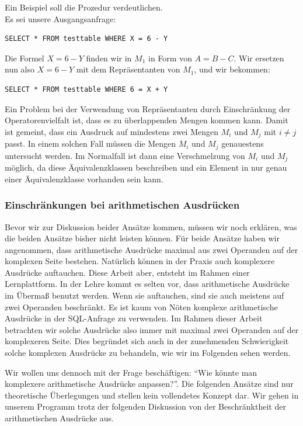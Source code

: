 Ein Beispiel soll die Prozedur verdeutlichen.\\

Es sei unsere Ausgangsanfrage: \begin{verbatim}SELECT * FROM testtable WHERE X = 6 - Y\end{verbatim}

Die Formel $X=6-Y$ finden wir in $M_1$ in Form von $A=B-C$. Wir ersetzen nun also $X=6-Y$ mit dem Repräsentanten von $M_1$, und wir bekommen: \begin{verbatim}SELECT * FROM testtable WHERE 6 = X + Y\end{verbatim}

Ein Problem bei der Verwendung von Repräsentanten durch Einschränkung der Operatorenvielfalt ist, dass es zu überlappenden Mengen kommen kann. Damit ist gemeint, dass ein Ausdruck auf mindestens zwei Mengen $M_i$ und $M_j$ mit $i\neq j$ passt. In einem solchen Fall müssen die Mengen $M_i$ und $M_j$ genauestens untersucht werden. Im Normalfall ist dann eine Verschmelzung von $M_i$ und $M_j$ möglich, da diese Äquivalenzklassen beschreiben und ein Element in nur genau einer Äquivalenzklasse vorhanden sein kann.

\subsubsection{Einschränkungen bei arithmetischen Ausdrücken}
\label{subsubsec:arithmetic}

Bevor wir zur Diskussion beider Ansätze kommen, müssen wir noch erklären, was die beiden Ansätze bisher nicht leisten können. Für beide Ansätze haben wir angenommen, dass arithmetische Ausdrücke maximal aus zwei Operanden auf der komplexen Seite bestehen. Natürlich können in der Praxis auch komplexere Ausdrücke auftauchen. Diese Arbeit aber, entsteht im Rahmen einer Lernplattform. In der Lehre kommt es selten vor, dass arithmetische Ausdrücke im Übermaß benutzt werden. Wenn sie auftauchen, sind sie auch meistens auf zwei Operanden beschränkt. Es ist kaum von Nöten komplexe arithmetische Ausdrücke in der SQL-Anfrage zu verwenden. Im Rahmen dieser Arbeit betrachten wir solche Ausdrücke also immer mit maximal zwei Operanden auf der komplexeren Seite. Dies begründet sich auch in der zunehmenden Schwierigkeit solche komplexen Ausdrücke zu behandeln, wie wir im Folgenden sehen werden.

Wir wollen uns dennoch mit der Frage beschäftigen: ``Wie könnte man komplexere arithmetische Ausdrücke anpassen?''. Die folgenden Ansätze sind nur theoretische Überlegungen und stellen kein vollendetes Konzept dar. Wir gehen in unserem Programm trotz der folgenden Diskussion von der Beschränktheit der arithmetischen Ausdrücke aus.

